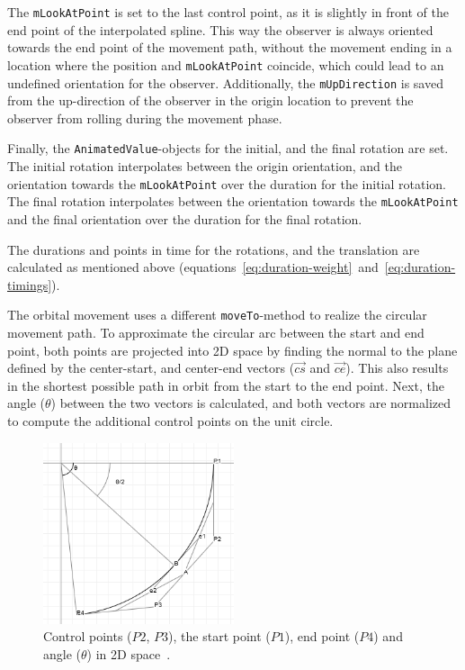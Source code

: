 The \texttt{mLookAtPoint} is set to the last control point, as it is slightly in front of the end point of the
interpolated spline.
This way the observer is always oriented towards the end point of the movement path, without the movement ending in a
location where the position and \texttt{mLookAtPoint} coincide, which could lead to an undefined orientation
for the observer.
Additionally, the \texttt{mUpDirection} is saved from the up-direction of the observer in the origin location to
prevent the observer from rolling during the movement phase.

Finally, the \texttt{AnimatedValue}-objects for the initial, and the final rotation are set.
The initial rotation interpolates between the origin orientation, and the orientation towards the
\texttt{mLookAtPoint} over the duration for the initial rotation.
The final rotation interpolates between the orientation towards the \texttt{mLookAtPoint} and the final
orientation over the duration for the final rotation.

The durations and points in time for the rotations, and the translation are calculated as mentioned above
(equations~\ref{eq:duration-weight}~and~\ref{eq:duration-timings}).

The orbital movement uses a different \texttt{moveTo}-method to realize the circular movement path.
To approximate the circular arc between the start and end point, both points are projected into 2D space by finding
the normal to the plane defined by the center-start, and center-end vectors ($\overrightarrow{cs}$ and
$\overrightarrow{ce}$).
This also results in the shortest possible path in orbit from the start to the end point.
Next, the angle ($\theta$) between the two vectors is calculated, and both vectors are normalized to compute the
additional control points on the unit circle.

\begin{figure}[h]
    \centering
    \includegraphics[width=0.5\textwidth]{content/4_3_autoNavigation/img/CircularCurveParameters}
    \caption{Control points ($P2$, $P3$), the start point ($P1$), end point ($P4$) and angle ($\theta$) in 2D
    space~\cite{Pomax2021}.}
    \label{fig:orbital-control-points}
\end{figure}

